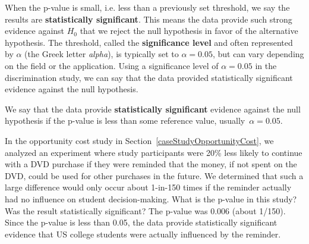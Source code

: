 When the p-value is small, i.e. less than a previously set threshold, we say the results are \textbf{statistically significant}. This means the data provide such strong evidence against $H_0$ that we reject the null hypothesis in favor of the alternative hypothesis. The threshold, called the \textbf{significance level} and often represented by $\alpha$ (the Greek letter \emph{alpha}\label{alphadiscussion}), is typically set to $\alpha = 0.05$, but can vary depending on the field or the application. Using a  significance level of $\alpha = 0.05$ in the discrimination study, we can say that the data provided statistically significant evidence against the null hypothesis.

\begin{termBox}{
We say that the data provide \textbf{statistically significant} evidence against the null hypothesis if the p-value is less than some reference value, usually~$\alpha=0.05$.}
\end{termBox}


\begin{example}{In the opportunity cost study in Section~\ref{caseStudyOpportunityCost}, we analyzed an experiment where study participants were 20\% less likely to continue with a DVD purchase if they were reminded that the money, if not spent on the DVD, could be used for other purchases in the future. We determined that such a large difference would only occur about 1-in-150 times if the reminder actually had no influence on student decision-making. What is the p-value in this study? Was the result statistically significant?}
The p-value was 0.006 (about 1/150). Since the p-value is less than 0.05, the data provide statistically significant evidence that US college students were actually influenced by the reminder.
\end{example}

